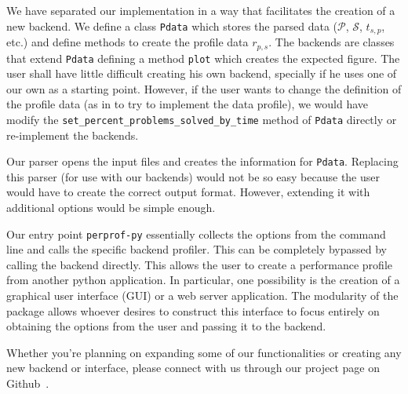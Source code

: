 We have separated our implementation in a way that facilitates the creation of a
new backend.
We define a class {\tt Pdata} which stores the parsed data ($\mathcal{P}$,
$\mathcal{S}$, $t_{s,p}$, etc.) and define methods to create the profile data
$r_{p,s}$.
The backends are classes that extend {\tt Pdata} defining a method {\tt plot}
which creates the expected figure.
The user shall have little difficult creating his own backend, specially if he
uses one of our own as a starting point.
However, if the user wants to change the definition of the profile data (as in
to try to implement the data profile), we would have modify the
{\tt set_percent_problems_solved_by_time} method of {\tt Pdata}
directly or re-implement the backends.

Our parser opens the input files and creates the information for {\tt Pdata}.
Replacing this parser (for use with our backends) would not be so easy
because the user would have to create the correct output format.  However,
extending it with additional options would be simple enough.

Our entry point {\tt perprof-py} essentially collects the options from the command
line and calls the specific backend profiler. This can be completely bypassed
by calling the backend directly. This allows the user to create a performance
profile from another python application. In particular, one possibility is the
creation of a graphical user interface (GUI)
or a web server application. The modularity of the package
allows whoever desires to construct this interface to focus entirely on
obtaining the options from the user and passing it to the backend.

Whether you're planning on expanding some of our functionalities or creating any
new backend or interface, please connect with us through our project page on
Github~\cite{url:perprof-py}.

